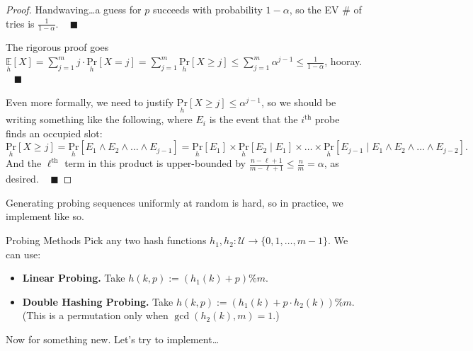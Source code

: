 \begin{proof}
    Handwaving\dots a guess for $p$ succeeds with probability $1 - \alpha$, so the EV \# of tries is $\frac{1}{1 - \alpha}$. ~ $\blacksquare$

    The rigorous proof goes $\underset{h}{\mathbb{E}}[X] = \displaystyle\sum_{j = 1}^m j \cdot \underset{h}{\mathrm{Pr}}[X = j] = \displaystyle \sum_{j = 1}^m \underset{h}{\mathrm{Pr}}[X \geq j] \leq \displaystyle\sum_{j = 1}^m \alpha^{j - 1} \leq \frac{1}{1 - \alpha}$, hooray. ~ $\blacksquare$

    Even more formally, we need to justify $\underset{h}{\mathrm{Pr}}[X \geq j] \leq \alpha^{j - 1}$, so we should be writing something like the following, where $E_i$ is the event that the $i^{\text{th}}$ probe finds an occupied slot:
    \[ \underset{h}{\mathrm{Pr}}[X \geq j] = \underset{h}{\mathrm{Pr}}[E_1 \wedge E_2 \wedge \dots \wedge E_{j - 1}] = \underset{h}{\mathrm{Pr}}[E_1] \times \underset{h}{\mathrm{Pr}}[E_2 \mid E_1] \times \dots \times \underset{h}{\mathrm{Pr}}[E_{j - 1} \mid E_1 \wedge E_2 \wedge \dots \wedge E_{j - 2}]. \]
    And the $\ell^{\text{th}}$ term in this product is upper-bounded by $\frac{n - \ell + 1}{m - \ell + 1} \leq \frac{n}{m} = \alpha$, as desired. ~ $\blacksquare$
\end{proof}

Generating probing sequences uniformly at random is hard, so in practice, we implement like so.

\begin{solution}{Probing Methods}
    Pick any two hash functions $h_1, h_2: \mathcal{U} \to \{0, 1, \dots, m - 1\}$.  We can use:
    \begin{itemize}
        \item \textbf{Linear Probing.} Take $h(k, p) := (h_1(k) + p) \%m$.
        \item \textbf{Double Hashing Probing.} Take $h(k, p) := (h_1(k) + p \cdot h_2(k)) \%m$.  (This is a permutation only when $\gcd(h_2(k), m) = 1$.)
    \end{itemize}
\end{solution}


Now for something new.  Let's try to implement\dots

